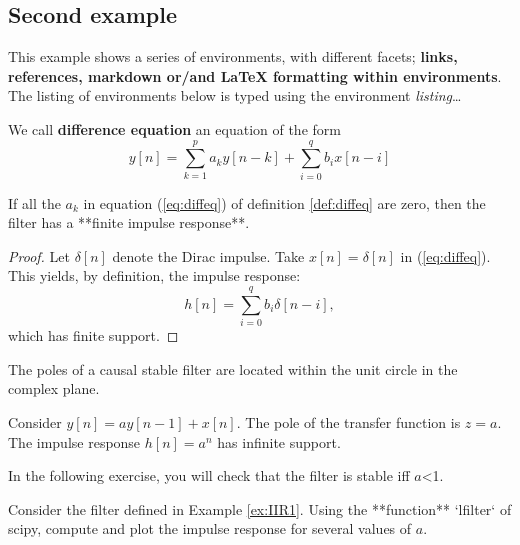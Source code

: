     \subsection{Second example}\label{second-example}

    This example shows a series of environments, with different facets;
\textbf{links, references, markdown or/and LaTeX formatting within
environments}. The listing of environments below is typed using the
environment \emph{listing}\ldots{}

    \begin{listing}
\begin{definition} \label{def:diffeq}
We call \textbf{difference equation} an equation of the form
$$
\label{eq:diffeq}
y[n]= \sum_{k=1}^{p} a_k y[n-k] + \sum_{i=0}^q b_i x[n-i]
$$
\end{definition}

\begin{property}
If all the $a_k$ in equation (\ref{eq:diffeq}) of definition \ref{def:diffeq} are zero, then the filter has a **finite impulse response**. 
\end{property}

\begin{proof}
Let $\delta[n]$ denote the Dirac impulse. Take $x[n]=\delta[n]$ in (\ref{eq:diffeq}). This yields, by definition, the impulse response:
$$
\label{eq:fir}
h[n]= \sum_{i=0}^q b_i \delta[n-i],
$$
which has finite support. 
\end{proof}

\begin{theorem}
The poles of a causal stable filter are located within the unit circle in the complex plane.
\end{theorem}

\begin{example} \label{ex:IIR1}
Consider $y[n]= a y[n-1] +  x[n]$. The pole of the transfer function is $z=a$. The impulse response $h[n]=a^n$ has infinite support.
\end{example}

In the following exercise, you will check that the filter is stable iff $a$<1.

\begin{exercise}\label{ex:exofilter}
Consider the filter defined in Example \ref{ex:IIR1}. Using the **function** `lfilter` of scipy, compute and plot the impulse response for several values of $a$.
\end{exercise}

\end{listing}

